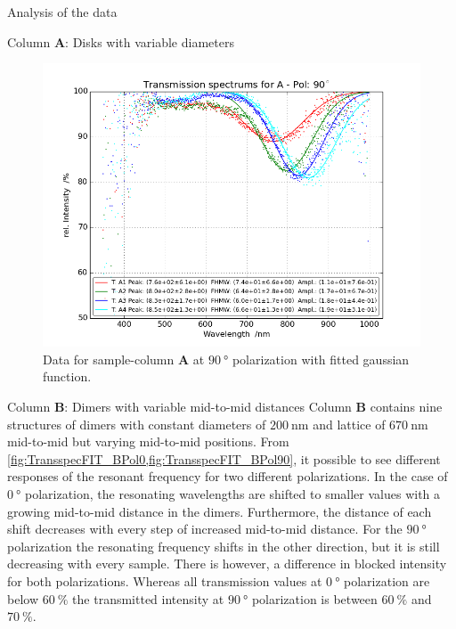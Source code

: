 \documentclass[pdftex, a4paper,11pt, twoside, UKenglish]{report}
\begin{document}
\begin{chapter}{Analysis of the data}
\begin{section}{Column \textbf{A}: Disks with variable diameters}
\begin{figure}[ht!]
        \begin{minipage}{.95\textwidth}
          \centering
          \includegraphics[width=\textwidth]
              {Figures/TransspecFIT_APol90.png}
          \caption{Data for sample-column \textbf{A} at $\SI{90}{\degree}$
              polarization with fitted gaussian function.}
          \label{fig:TransspecFIT_APol90}
        \end{minipage}
      \end{figure}
      
    \end{section}
    
    
    
    \newpage
    \begin{section}{Column \textbf{B}: Dimers with variable mid-to-mid
        distances}
      \label{chp:DataB}
      Column \textbf{B} contains nine structures of dimers with constant
      diameters of $\SI{200}{\nano\meter}$ and lattice of
      $\SI{670}{\nano\meter}$ mid-to-mid but varying mid-to-mid positions. From
      \cref{fig:TransspecFIT_BPol0,fig:TransspecFIT_BPol90}, it possible to see
      different responses of the resonant frequency for two different
      polarizations. In the case of $\SI{0}{\degree}$ polarization, the
      resonating wavelengths are shifted to smaller values with a growing
      mid-to-mid distance in the dimers. Furthermore, the distance of each
      shift decreases with every step of increased mid-to-mid distance.
      For the $\SI{90}{\degree}$ polarization the resonating frequency shifts
      in the other direction, but it is still decreasing with every sample.
      There is however, a difference in blocked intensity for both
      polarizations. Whereas all transmission values at $\SI{0}{\degree}$
      polarization are below $\SI{60}{\percent}$ the transmitted intensity
      at $\SI{90}{\degree}$ polarization is between $\SI{60}{\percent}$ and 
      $\SI{70}{\percent}$.


\end{section}
\end{chapter}
\end{document}
